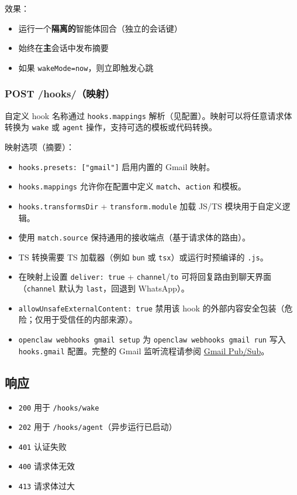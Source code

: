 效果：

\begin{itemize}
  \item 运行一个\textbf{隔离的}智能体回合（独立的会话键）
  \item 始终在\textbf{主}会话中发布摘要
  \item 如果 \texttt{wakeMode=now}，则立即触发心跳
\end{itemize}


\subsubsection{POST /hooks/（映射）}


自定义 hook 名称通过 \texttt{hooks.mappings} 解析（见配置）。映射可以将任意请求体转换为 \texttt{wake} 或 \texttt{agent} 操作，支持可选的模板或代码转换。

映射选项（摘要）：

\begin{itemize}
  \item \texttt{hooks.presets: ["gmail"]} 启用内置的 Gmail 映射。
  \item \texttt{hooks.mappings} 允许你在配置中定义 \texttt{match}、\texttt{action} 和模板。
  \item \texttt{hooks.transformsDir} + \texttt{transform.module} 加载 JS/TS 模块用于自定义逻辑。
  \item 使用 \texttt{match.source} 保持通用的接收端点（基于请求体的路由）。
  \item TS 转换需要 TS 加载器（例如 \texttt{bun} 或 \texttt{tsx}）或运行时预编译的 \texttt{.js}。
  \item 在映射上设置 \texttt{deliver: true} + \texttt{channel}/\texttt{to} 可将回复路由到聊天界面（\texttt{channel} 默认为 \texttt{last}，回退到 WhatsApp）。
  \item \texttt{allowUnsafeExternalContent: true} 禁用该 hook 的外部内容安全包装（危险；仅用于受信任的内部来源）。
  \item \texttt{openclaw webhooks gmail setup} 为 \texttt{openclaw webhooks gmail run} 写入 \texttt{hooks.gmail} 配置。完整的 Gmail 监听流程请参阅 \href{/automation/gmail-pubsub}{Gmail Pub/Sub}。
\end{itemize}


\subsection{响应}


\begin{itemize}
  \item \texttt{200} 用于 \texttt{/hooks/wake}
  \item \texttt{202} 用于 \texttt{/hooks/agent}（异步运行已启动）
  \item \texttt{401} 认证失败
  \item \texttt{400} 请求体无效
  \item \texttt{413} 请求体过大
\end{itemize}


